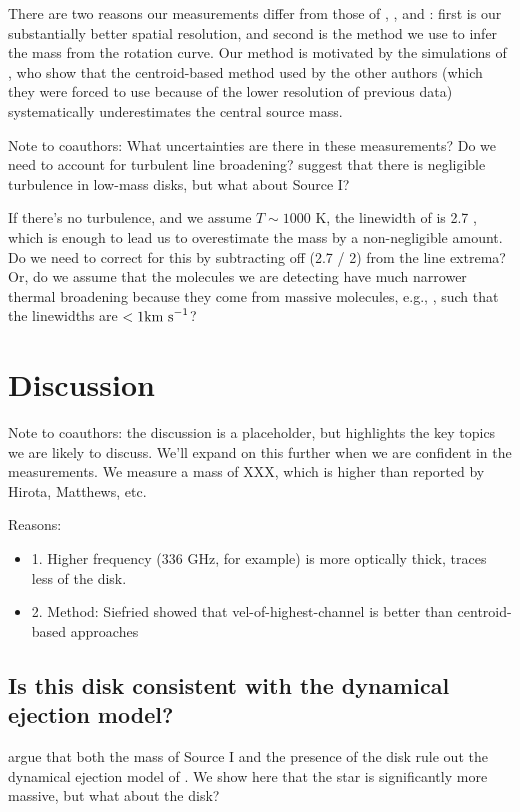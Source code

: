 \documentclass[twocolumn]{aastex61}
\begin{document}
There are two reasons our measurements differ from those of \citet{Plambeck2016a},
\citet{Hirota2014a}, and \citet{Matthews2010a}: first is our substantially better
spatial resolution, and second is the method we use to infer the mass from the
rotation curve.  Our method is motivated by the simulations of \citet{Seifried2016a},
who show that the centroid-based method used by the other authors (which they were forced
to use because of the lower resolution of previous data) systematically
underestimates the central source mass.

{\color{red} Note to coauthors:
What uncertainties are there in these measurements?
Do we need to account for turbulent line broadening?
\citet{Flaherty2017a} suggest that there is negligible turbulence in low-mass disks,
but what about Source I?

If there's no turbulence, and we assume $T\sim1000$ K, the
linewidth of \hh is 2.7 \kms, which is enough to lead us to overestimate the mass by a
non-negligible amount.  Do we need to correct for this by subtracting off (2.7 / 2) \kms
from the line extrema?  Or, do we assume that the molecules we are detecting have
much narrower thermal broadening because they come from massive molecules, e.g., \methanol,
such that the linewidths are $<1 \textrm{km~s}^{-1}$?
}


\section{Discussion}
{\color{red} Note to coauthors: the discussion is a placeholder, but highlights
the key topics we are likely to discuss.  We'll expand on this further when
we are confident in the measurements.}
We measure a mass of XXX, which is higher than reported by Hirota, Matthews, etc.

Reasons:
\begin{itemize}
    \item1. Higher frequency (336 GHz, for example) is more optically thick, traces less
of the disk.
\item2. Method: Siefried showed that vel-of-highest-channel is better than centroid-based
approaches
\end{itemize}

\subsection{Is this disk consistent with the dynamical ejection model?}
\citet{Plambeck2016a} argue that both the mass of Source I and the presence of the disk
rule out the dynamical ejection model of \citet{Bally2011a}.  We show here that
the star is significantly more massive, but what about the disk?
\end{document}
